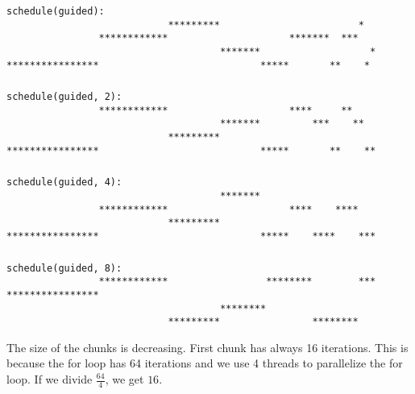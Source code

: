 \documentclass[paper=letter, fontsize=12pt]{article}
\begin{document}
\subsubsection{}
\begin{verbatim}
schedule(guided):      
                            *********                        *  
                ************                     *******  ***   
                                     *******                   *
****************                            *****       **    * 
\end{verbatim}

\subsubsection{}
\begin{verbatim}
schedule(guided, 2):   
                ************                     ****     **    
                                     *******         ***    **  
                            *********                           
****************                            *****       **    **
\end{verbatim}

\subsubsection{}
\begin{verbatim}
schedule(guided, 4):   
                                     *******                    
                ************                     ****    ****   
                            *********                           
****************                            *****    ****    ***
\end{verbatim}

\subsubsection{}
\begin{verbatim}
schedule(guided, 8):   
                ************                 ********        ***
****************                                                
                                     ********                   
                            *********                ********
\end{verbatim}

The size of the chunks is decreasing. First chunk has always 16 iterations. This is because the for loop has 64 iterations and we use 4 threads to parallelize the for loop. If we divide $ \frac{64}{4} $, we get $ 16 $.
\end{document}
